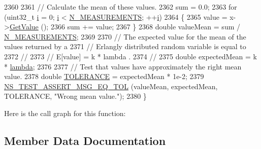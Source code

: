 \begin{DoxyCode}
2360 
2361   \textcolor{comment}{// Calculate the mean of these values.}
2362   sum = 0.0;
2363   \textcolor{keywordflow}{for} (uint32\_t \hyperlink{bernuolliDistribution_8m_a6f6ccfcf58b31cb6412107d9d5281426}{i} = 0; \hyperlink{bernuolliDistribution_8m_a6f6ccfcf58b31cb6412107d9d5281426}{i} < \hyperlink{classRandomVariableStreamErlangAntitheticTestCase_abcfab6f7ba6ed16802e3505c2c023c79}{N\_MEASUREMENTS}; ++\hyperlink{bernuolliDistribution_8m_a6f6ccfcf58b31cb6412107d9d5281426}{i})
2364     \{
2365       value = x->\hyperlink{classns3_1_1ErlangRandomVariable_a144e603fbee33b5167339f90d4dd4a57}{GetValue} ();
2366       sum += value;
2367     \}
2368   \textcolor{keywordtype}{double} valueMean = sum / \hyperlink{classRandomVariableStreamErlangAntitheticTestCase_abcfab6f7ba6ed16802e3505c2c023c79}{N\_MEASUREMENTS};
2369 
2370   \textcolor{comment}{// The expected value for the mean of the values returned by a}
2371   \textcolor{comment}{// Erlangly distributed random variable is equal to }
2372   \textcolor{comment}{//}
2373   \textcolor{comment}{//     E[value]  =  k * lambda  .}
2374   \textcolor{comment}{//}
2375   \textcolor{keywordtype}{double} expectedMean = k * \hyperlink{loss__ITU1238_8m_aca36b09d6e71a60cfa3837d7e24c07ca}{lambda};
2376 
2377   \textcolor{comment}{// Test that values have approximately the right mean value.}
2378   \textcolor{keywordtype}{double} \hyperlink{spectrum-value-test_8cc_a30c17564229ec2e37dfea9c6c9ad643e}{TOLERANCE} = expectedMean * 1e-2;
2379   \hyperlink{group__testing_ga9e7861b56b4e70db3b56044cb7a28e41}{NS\_TEST\_ASSERT\_MSG\_EQ\_TOL} (valueMean, expectedMean, TOLERANCE, \textcolor{stringliteral}{"Wrong mean
       value."}); 
2380 \}
\end{DoxyCode}


Here is the call graph for this function\+:




\subsection{Member Data Documentation}

